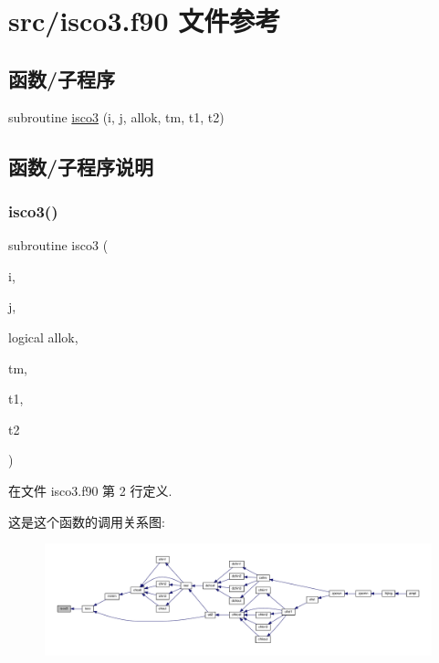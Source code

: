 \hypertarget{isco3_8f90}{}\section{src/isco3.f90 文件参考}
\label{isco3_8f90}
\subsection*{函数/子程序}
\begin{DoxyCompactItemize}
\item 
subroutine \mbox{\hyperlink{isco3_8f90_a0eb776cad21368d6bbef43aa0e63baae}{isco3}} (i, j, allok, tm, t1, t2)
\end{DoxyCompactItemize}


\subsection{函数/子程序说明}
\mbox{\label{isco3_8f90_a0eb776cad21368d6bbef43aa0e63baae}} 
\subsubsection{\texorpdfstring{isco3()}{isco3()}}
{\footnotesize\ttfamily subroutine isco3 (\begin{DoxyParamCaption}\item[{}]{i,  }\item[{}]{j,  }\item[{logical}]{allok,  }\item[{}]{tm,  }\item[{}]{t1,  }\item[{}]{t2 }\end{DoxyParamCaption})}



在文件 isco3.\+f90 第 2 行定义.

这是这个函数的调用关系图\+:
\nopagebreak
\begin{figure}[H]
\begin{center}
\leavevmode
\includegraphics[width=350pt]{isco3_8f90_a0eb776cad21368d6bbef43aa0e63baae_icgraph}
\end{center}
\end{figure}
